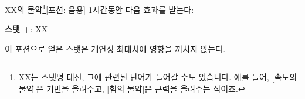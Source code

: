 \documentclass{report}
\begin{document}
	\begin{story}{XX의 물약\footnote{XX는 스탯명 대신, 그에 관련된 단어가 들어갈 수도 있습니다. 예를 들어, [속도의 물약]은 기민을 올려주고, [힘의 물약]은 근력을 올려주는 식이죠.}}{[포션: 음용]}
		1시간동안 다음 효과를 받는다:
		
		\textbf{스탯 +}: XX
		
		이 포션으로 얻은 스탯은 개연성 최대치에 영향을 끼치지 않는다.
		
	\end{story}
\end{document}
